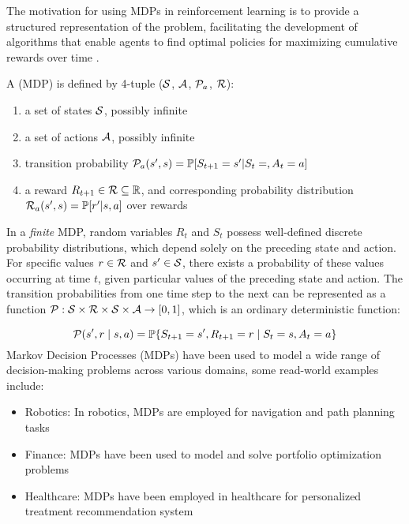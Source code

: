 The motivation for using MDPs in reinforcement learning is to provide a structured representation of the problem, facilitating the development of algorithms that enable agents to find optimal policies for maximizing cumulative rewards over time \cite{RL2}.
\begin{definition}
    A  (MDP) is defined by 4-tuple ($\mathcal{S}$, $\mathcal A$, $\mathcal P_a$, $\mathcal R$):
    \begin{enumerate}
        \item a set of states $\mathcal{S}$, possibly infinite
        \item a set of actions $\mathcal A$, possibly infinite
        \item  transition probability $\mathcal P_a(s',s) = \mathbb P [S_{t+1} = s'| S_{t} = ,A_{t} = a]$
        \item a reward $R_{t+1} \in \mathcal R \subseteq \mathbb R$, and corresponding probability distribution $ \mathcal R_a(s',s) = \mathbb P[r' | s,a]$ over rewards
    \end{enumerate}
\end{definition}

In a \textit{finite} MDP, random variables $R_t$ and $S_t$ possess well-defined discrete probability distributions, which depend solely on the preceding state and action. For specific values $r \in \mathcal R$ and $s' \in \mathcal{S}$, there exists a probability of these values occurring at time $t$, given particular values of the preceding state and action. The transition probabilities from one time step to the next can be represented as a function $\mathcal P: \mathcal{S} \times \mathcal R \times 
\mathcal{S} \times \mathcal A \to [0,1]$, which is an ordinary deterministic function\cite{RL}:

\begin{equation}
    \mathcal P(s', r \mid s, a) = \mathbb{P}\{S_{t+1} = s', R_{t+1} = r \mid S_t = s, A_t = a\}
\end{equation}
Markov Decision Processes (MDPs) have been used to model a wide range of decision-making problems across various domains, some read-world examples include:
\begin{itemize}
    \item Robotics: In robotics, MDPs are employed for navigation and path planning tasks \cite{thrun2005}
    \item Finance: MDPs have been used to model and solve portfolio optimization problems \cite{buehler2019}
    \item Healthcare: MDPs have been employed in healthcare for personalized treatment recommendation system 
    \cite{komorowski2018}
\end{itemize}

